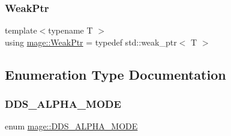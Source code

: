 \hypertarget{namespacemage_aa159a63c0d58464bdf32dfe419dd5dc1}{}\label{namespacemage_aa159a63c0d58464bdf32dfe419dd5dc1} 
\subsubsection{\texorpdfstring{Weak\+Ptr}{WeakPtr}}
{\footnotesize\ttfamily template$<$typename T $>$ \\
using \hyperlink{namespacemage_aa159a63c0d58464bdf32dfe419dd5dc1}{mage\+::\+Weak\+Ptr} = typedef std\+::weak\+\_\+ptr$<$ T $>$}



\subsection{Enumeration Type Documentation}
\hypertarget{namespacemage_a0c586a2bad862f4858900ca121ca80c2}{}\label{namespacemage_a0c586a2bad862f4858900ca121ca80c2} 
\subsubsection{\texorpdfstring{D\+D\+S\+\_\+\+A\+L\+P\+H\+A\+\_\+\+M\+O\+DE}{DDS\_ALPHA\_MODE}}
{\footnotesize\ttfamily enum \hyperlink{namespacemage_a0c586a2bad862f4858900ca121ca80c2}{mage\+::\+D\+D\+S\+\_\+\+A\+L\+P\+H\+A\+\_\+\+M\+O\+DE}}

